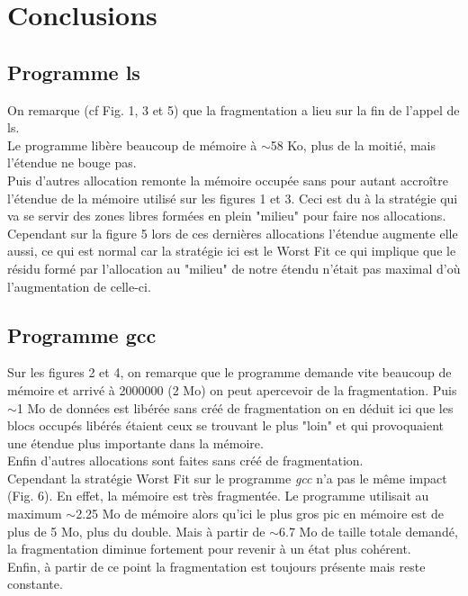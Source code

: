 \documentclass{article}
\begin{document}
\newpage
\section{Conclusions}

\subsection{Programme ls}

On remarque (cf Fig. 1, 3 et 5) que la fragmentation a lieu sur la fin de l'appel de ls.\\
Le programme libère beaucoup de mémoire à $\sim$58 Ko, plus de la moitié, mais l'étendue ne bouge pas.\\

Puis d'autres allocation remonte la mémoire occupée sans pour autant accroître l'étendue de la mémoire utilisé sur les figures 1 et 3. Ceci est du à la stratégie qui va se servir des zones libres formées en plein "milieu" pour faire nos allocations. Cependant sur la figure 5 lors de ces dernières allocations l'étendue augmente elle aussi, ce qui est normal car la stratégie ici est le Worst Fit ce qui implique que le résidu formé par l'allocation au "milieu" de notre étendu n'était pas maximal d'où l'augmentation de celle-ci.

\subsection{Programme gcc}

Sur les figures 2 et 4, on remarque que le programme demande vite beaucoup de mémoire et arrivé à 2000000 (2 Mo) on peut apercevoir de la fragmentation. Puis $\sim$1 Mo de données est libérée sans créé de fragmentation on en déduit ici que les blocs occupés libérés étaient ceux se trouvant le plus "loin" et qui provoquaient une étendue plus importante dans la mémoire.\\
Enfin d'autres allocations sont faites sans créé de fragmentation.\\

Cependant la stratégie Worst Fit sur le programme \textit{gcc} n'a pas le même impact (Fig. 6). En effet, la mémoire est très fragmentée. Le programme utilisait au maximum $\sim$2.25 Mo de mémoire alors qu'ici le plus gros pic en mémoire est de plus de 5 Mo, plus du double. Mais à partir de $\sim$6.7 Mo de taille totale demandé, la fragmentation diminue fortement pour revenir à un état plus cohérent.\\
Enfin, à partir de ce point la fragmentation est toujours présente mais reste constante.\\
\end{document}
